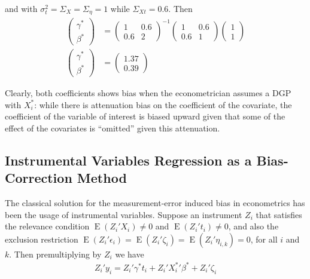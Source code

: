 \documentclass[12pt]{article}
\begin{document}
        and with $\sigma^2_t=\Sigma_X=\Sigma_\eta=1$ while $\Sigma_{Xt}=0.6$. Then
        \begin{align*}
            \left(\begin{array}{l}
        {\gamma}^* \\
        {\beta}^*
        \end{array}\right)& =\left(\begin{array}{cc}
        1 & 0.6 \\
        0.6 & 2
        \end{array}\right)^{-1}\left(\begin{array}{cc}
        1 & 0.6 \\
        0.6 & 1
        \end{array}\right)\left(\begin{array}{l}
        1\\
        1
        \end{array}\right) \\
        \left(\begin{array}{l}
        {\gamma}^* \\
        {\beta}^*
        \end{array}\right)&=\left(\begin{array}{l}
        1.37 \\
        0.39
        \end{array}\right)
        \end{align*}

        Clearly, both coefficients shows bias when the econometrician assumes a DGP with $X_i^*$: while there is attenuation bias on the coefficient of the covariate, the coefficient of the variable of interest is biased upward given that some of the effect of the covariates is ``omitted'' given this attenuation.

    \subsection*{Instrumental Variables Regression as a Bias-Correction Method}

        The classical solution for the measurement-error induced bias in econometrics has been the usage of instrumental variables. Suppose an instrument $Z_i$ that satisfies the relevance condition $\operatorname{E}(Z_i'X_i)\neq 0$ and $\operatorname{E}(Z_i't_i)\neq 0$, and also the exclusion restriction $\operatorname{E}(Z_i'\epsilon_i)=\operatorname{E}(Z_i'\zeta_i)=\operatorname{E}(Z_i'\eta_{i,k})=0$, for all $i$ and $k$. Then premultiplying by $Z_i$ we have
        \begin{align}
            Z_i'y_i =  Z_i'\gamma^* t_i +  Z_i'{X^{*}_i}' \beta^* +  Z_i'\zeta_i
        \end{align}
\end{document}
